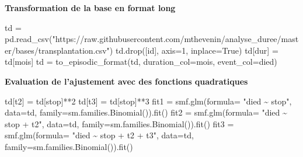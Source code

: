 \documentclass[
  12pt,
  letterpaper,
  DIV=11,
  numbers=noendperiod,
  onepage,
  openany]{scrreprt}
\newenvironment{Shaded}{\begin{snugshade}}{\end{snugshade}}
\newcommand{\DecValTok}[1]{\textcolor[rgb]{0.86,0.86,0.80}{#1}}
\newcommand{\NormalTok}[1]{\textcolor[rgb]{0.80,0.80,0.80}{#1}}
\newcommand{\OperatorTok}[1]{\textcolor[rgb]{0.94,0.94,0.82}{#1}}
\newcommand{\StringTok}[1]{\textcolor[rgb]{0.80,0.58,0.58}{#1}}
\newcommand{\VariableTok}[1]{\textcolor[rgb]{0.80,0.80,0.80}{#1}}
\begin{document}
\textbf{Transformation de la base en format long}

\begin{Shaded}
\begin{Highlighting}[]
\NormalTok{td }\OperatorTok{=}\NormalTok{ pd.read\_csv(}\StringTok{"https://raw.githubusercontent.com/mthevenin/analyse\_duree/master/bases/transplantation.csv"}\NormalTok{)}
\NormalTok{td.drop([}\StringTok{\textquotesingle{}id\textquotesingle{}}\NormalTok{], axis}\OperatorTok{=}\DecValTok{1}\NormalTok{, inplace}\OperatorTok{=}\VariableTok{True}\NormalTok{)}
\NormalTok{td[}\StringTok{\textquotesingle{}dur\textquotesingle{}}\NormalTok{] }\OperatorTok{=}\NormalTok{ td[}\StringTok{\textquotesingle{}mois\textquotesingle{}}\NormalTok{]}
\NormalTok{td }\OperatorTok{=}\NormalTok{ to\_episodic\_format(td, duration\_col}\OperatorTok{=}\StringTok{\textquotesingle{}mois\textquotesingle{}}\NormalTok{, event\_col}\OperatorTok{=}\StringTok{\textquotesingle{}died\textquotesingle{}}\NormalTok{)}
\end{Highlighting}
\end{Shaded}

\textbf{Evaluation de l'ajustement avec des fonctions quadratiques}

\begin{Shaded}
\begin{Highlighting}[]
\NormalTok{td[}\StringTok{\textquotesingle{}t2\textquotesingle{}}\NormalTok{] }\OperatorTok{=}\NormalTok{ td[}\StringTok{\textquotesingle{}stop\textquotesingle{}}\NormalTok{]}\OperatorTok{**}\DecValTok{2}
\NormalTok{td[}\StringTok{\textquotesingle{}t3\textquotesingle{}}\NormalTok{] }\OperatorTok{=}\NormalTok{ td[}\StringTok{\textquotesingle{}stop\textquotesingle{}}\NormalTok{]}\OperatorTok{**}\DecValTok{3}
\NormalTok{fit1 }\OperatorTok{=}\NormalTok{ smf.glm(formula}\OperatorTok{=}  \StringTok{"died \textasciitilde{} stop"}\NormalTok{, data}\OperatorTok{=}\NormalTok{td, family}\OperatorTok{=}\NormalTok{sm.families.Binomial()).fit()}
\NormalTok{fit2 }\OperatorTok{=}\NormalTok{ smf.glm(formula}\OperatorTok{=}  \StringTok{"died \textasciitilde{} stop + t2"}\NormalTok{, data}\OperatorTok{=}\NormalTok{td, family}\OperatorTok{=}\NormalTok{sm.families.Binomial()).fit()}
\NormalTok{fit3 }\OperatorTok{=}\NormalTok{ smf.glm(formula}\OperatorTok{=}  \StringTok{"died \textasciitilde{} stop + t2 + t3"}\NormalTok{, data}\OperatorTok{=}\NormalTok{td, family}\OperatorTok{=}\NormalTok{sm.families.Binomial()).fit()}
\end{Highlighting}
\end{Shaded}
\end{document}
